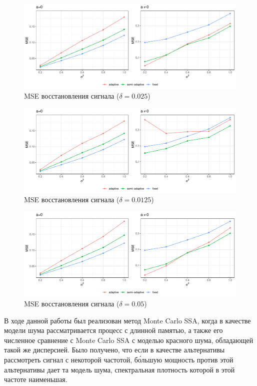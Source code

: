 \documentclass[specialist,
substylefile = spbu_report.rtx,
subf,href,colorlinks=true, 12pt]{disser}
\theoremstyle{definition}
\begin{document}
\begin{figure}[h!]
    \centering
    \includegraphics[width=\linewidth]{img/mse.pdf}
    \caption{MSE восстановления сигнала ($\delta=0.025$)}
    \label{fig:mse1}
\end{figure}
\begin{figure}[h!]
    \centering
    \includegraphics[width=\linewidth]{img/mse_delta_smaller.pdf}
    \caption{MSE восстановления сигнала ($\delta=0.0125$)}
    \label{fig:mse2}
\end{figure}
\begin{figure}[h!]
    \centering
    \includegraphics[width=\linewidth]{img/mse_delta_bigger.pdf}
    \caption{MSE восстановления сигнала ($\delta=0.05$)}
    \label{fig:mse3}
\end{figure}


\conclusion
В ходе данной работы был реализован метод Monte Carlo SSA, когда в качестве модели шума рассматривается процесс с длинной памятью, а также его численное сравнение с Monte Carlo SSA с моделью красного шума, обладающей такой же дисперсией. Было получено, что если в качестве альтернативы рассмотреть сигнал с некоторой частотой, б\'{о}льшую мощность против этой альтернативы дает та модель шума, спектральная плотность которой в этой частоте наименьшая.
\end{document}
